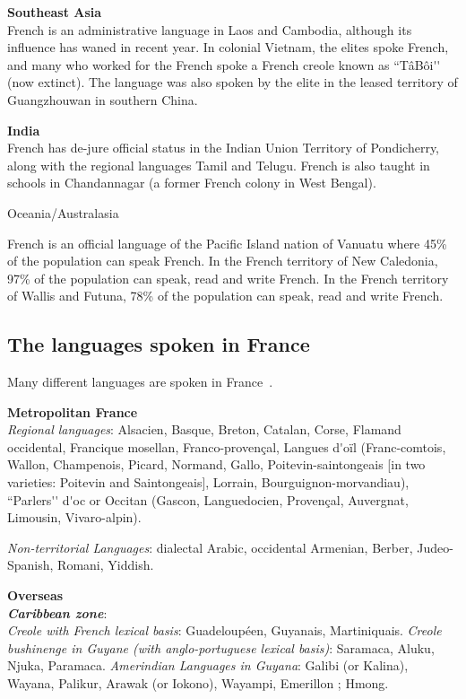 \begin{multicols}{2}
{\bf Southeast Asia }\\
French is an administrative language in Laos and Cambodia, although
its influence has waned in recent year. In colonial Vietnam, the
elites spoke French, and many who worked for the French spoke a French
creole known as ``TâBôi{\mbox '}{\mbox '} (now extinct). The language was also spoken
by the elite in the leased territory of Guangzhouwan in southern
China.

{\bf India}\\
French has de-jure official status in the Indian Union Territory of
Pondicherry, along with the regional languages Tamil and
Telugu. French is also taught in schools in Chandannagar (a former
French colony in West Bengal).

\begin{center}
{\sc Oceania/Australasia}
\end{center}
French is an official language of the Pacific Island nation of Vanuatu
where 45\% of the population can speak French. In the French territory
of New Caledonia, 97\% of the population can speak, read and write
French. In the French territory of Wallis and Futuna, 78\% of the
population can speak, read and write French.

\subsection{The languages spoken in France}
\label{languageSpokenInTheFranceEn}
Many different languages are spoken in France~\cite{languesparleesfrance}.

{\bf Metropolitan France}\\
{\it Regional languages}: Alsacien, Basque, Breton, Catalan, Corse, Flamand occidental, Francique mosellan, Franco-provençal, Langues d{\mbox '}oïl (Franc-comtois, Wallon, Champenois, Picard, Normand, Gallo, Poitevin-saintongeais [in two varieties: Poitevin and Saintongeais], Lorrain, Bourguignon-morvandiau), ``Parlers{\mbox '}{\mbox '} d{\mbox '}oc or Occitan (Gascon, Languedocien, Provençal, Auvergnat, Limousin, Vivaro-alpin).

{\it Non-territorial Languages}: dialectal Arabic, occidental Armenian, Berber, Judeo-Spanish, Romani, Yiddish.

{\bf Overseas}\\
\textbf{ \emph{Caribbean zone}}:\\
{\it Creole with French lexical basis}: Guadeloupéen, Guyanais, Martiniquais.
{\it Creole bushinenge in Guyane (with anglo-portuguese lexical basis)}: Saramaca, Aluku, Njuka, Paramaca.
{\it Amerindian Languages in Guyana}: Galibi (or Kalina), Wayana, Palikur, Arawak (or Iokono), Wayampi, Emerillon ; Hmong.


\end{multicols}
